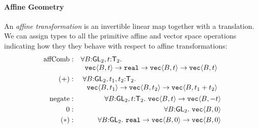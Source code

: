 \paragraph{Affine Geometry} An \emph{affine transformation} is
an invertible linear map together with a translation. We can assign
types to all the primitive affine and vector space operations
indicating how they they behave with respect to affine
transformations:
\begin{eqnarray*}
  \mathrm{affComb} & : &
  \begin{array}[t]{@{}l}
    \forall B \mathord: \SynGL{2}, t \mathord: \SynTransl{2}.\\
    \hspace{0.2cm} \tyPrim{vec}{B,t} \to \tyPrimNm{real} \to
    \tyPrim{vec}{B,t} \to \tyPrim{vec}{B,t}
  \end{array}
  \\
  (+) & : &
  \begin{array}[t]{@{}l}
    \forall B \mathord: \SynGL{2}, t_1,t_2 \mathord: \SynTransl{2}. \\
    \hspace{0.2cm}\tyPrim{vec}{B,t_1} \to \tyPrim{vec}{B,t_2} \to
    \tyPrim{vec}{B,t_1 + t_2}
  \end{array}
  \\
  \mathrm{negate} & : & \forall B \mathord: \SynGL{2}, t \mathord: \SynTransl{2}.\ \tyPrim{vec}{B,t} \to \tyPrim{vec}{B,-t} \\
  0 & : & \forall B \mathord: \SynGL{2}.\ \tyPrim{vec}{B,0} \\
  (*) & : & \forall B \mathord: \SynGL{2}.\ \tyPrimNm{real} \to \tyPrim{vec}{B,0} \to \tyPrim{vec}{B,0}
\end{eqnarray*}

